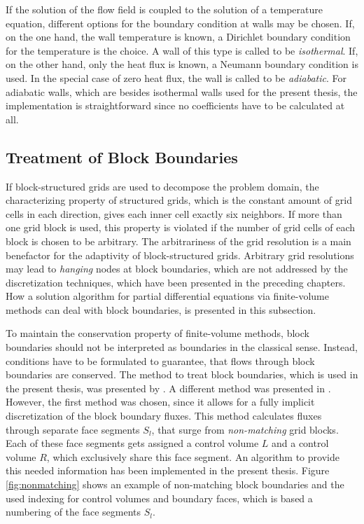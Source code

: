 If the solution of the flow field is coupled to the solution of a temperature equation, different options for the boundary condition at walls may be chosen. If, on the one hand, the wall temperature is known, a Dirichlet boundary condition for the temperature is the choice. A wall of this type is called to be \emph{isothermal}. If, on the other hand, only the heat flux is known, a Neumann boundary condition is used. In the special case of zero heat flux, the wall is called to be \emph{adiabatic}. For adiabatic walls, which are besides isothermal walls used for the present thesis, the implementation is straightforward since no coefficients have to be calculated at all.

\subsection{Treatment of Block Boundaries}
\label{sec:blockboundaries}

If block-structured grids are used to decompose the problem domain, the characterizing property of structured grids, which is the constant amount of grid cells in each direction, gives each inner cell exactly six neighbors. If more than one grid block is used, this property is violated if the number of grid cells of each block is chosen to be arbitrary. The arbitrariness of the grid resolution is a main benefactor for the adaptivity of block-structured grids. Arbitrary grid resolutions may lead to \emph{hanging} nodes at block boundaries, which are not addressed by the discretization techniques, which have been presented in the preceding chapters. How a solution algorithm for partial differential equations via finite-volume methods can deal with block boundaries, is presented in this subsection.

To maintain the conservation property \cite{schaefer99} of finite-volume methods, block boundaries should not be interpreted as boundaries in the classical sense. Instead, conditions have to be formulated to guarantee, that flows through block boundaries are conserved. The method to treat block boundaries, which is used in the present thesis, was presented by \cite{lilek97}. A different method was presented in \cite{lange02}. However, the first method was chosen, since it allows for a fully implicit discretization of the block boundary fluxes. This method calculates fluxes through separate face segments \(S_l\), that surge from \emph{non-matching} grid blocks. Each of these face segments gets assigned a control volume \(L\) and a control volume \(R\), which exclusively share this face segment. An algorithm to provide this needed information has been implemented in the present thesis. Figure \ref{fig:nonmatching} shows an example of non-matching block boundaries and the used indexing for control volumes and boundary faces, which is based a numbering of the face segments \(S_l\).

